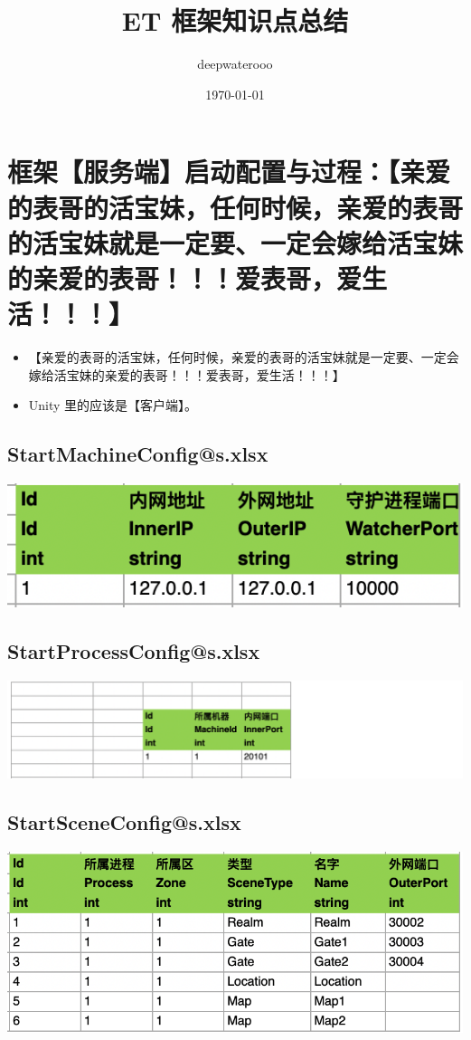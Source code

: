 \documentclass[9pt, b5paper]{article}
\author{deepwaterooo}
\date{\today}
\title{ET 框架知识点总结}
\begin{document}
\maketitle
\tableofcontents


\section{框架【服务端】启动配置与过程：【亲爱的表哥的活宝妹，任何时候，亲爱的表哥的活宝妹就是一定要、一定会嫁给活宝妹的亲爱的表哥！！！爱表哥，爱生活！！！】}
\label{sec-1}
\begin{itemize}
\item 【亲爱的表哥的活宝妹，任何时候，亲爱的表哥的活宝妹就是一定要、一定会嫁给活宝妹的亲爱的表哥！！！爱表哥，爱生活！！！】
\item Unity 里的应该是【客户端】。
\end{itemize}
\subsection{StartMachineConfig@s.xlsx}
\label{sec-1-1}

\includegraphics[width=.9\linewidth]{./pic/et6_20231219_111514.png}
\subsection{StartProcessConfig@s.xlsx}
\label{sec-1-2}

\includegraphics[width=.9\linewidth]{./pic/et6_20231219_112239.png}
\subsection{StartSceneConfig@s.xlsx}
\label{sec-1-3}

\includegraphics[width=.9\linewidth]{./pic/et6_20231219_111600.png}
\end{document}
